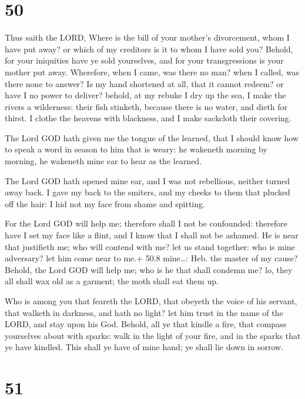 \hypertarget{section-49}{%
\section{50}\label{section-49}}

 Thus saith the LORD, Where is the bill of your mother's
divorcement, whom I have put away? or which of my creditors is it to
whom I have sold you? Behold, for your iniquities have ye sold
yourselves, and for your transgressions is your mother put away.
 Wherefore, when I came, was there no man? when I called,
was there none to answer? Is my hand shortened at all, that it cannot
redeem? or have I no power to deliver? behold, at my rebuke I dry up the
sea, I make the rivers a wilderness: their fish stinketh, because there
is no water, and dieth for thirst.  I clothe the heavens
with blackness, and I make sackcloth their covering.

 The Lord GOD hath given me the tongue of the learned, that
I should know how to speak a word in season to him that is weary: he
wakeneth morning by morning, he wakeneth mine ear to hear as the
learned.

 The Lord GOD hath opened mine ear, and I was not
rebellious, neither turned away back.  I gave my back to the
smiters, and my cheeks to them that plucked off the hair: I hid not my
face from shame and spitting.

 For the Lord GOD will help me; therefore shall I not be
confounded: therefore have I set my face like a flint, and I know that I
shall not be ashamed.  He is near that justifieth me; who
will contend with me? let us stand together: who is mine adversary? let
him come near to me.+ 50.8 mine\ldots: Heb. the master of my cause?
 Behold, the Lord GOD will help me; who is he that shall
condemn me? lo, they all shall wax old as a garment; the moth shall eat
them up.

 Who is among you that feareth the LORD, that obeyeth the
voice of his servant, that walketh in darkness, and hath no light? let
him trust in the name of the LORD, and stay upon his God. 
Behold, all ye that kindle a fire, that compass yourselves about with
sparks: walk in the light of your fire, and in the sparks that ye have
kindled. This shall ye have of mine hand; ye shall lie down in sorrow.

\hypertarget{section-50}{%
\section{51}\label{section-50}}

